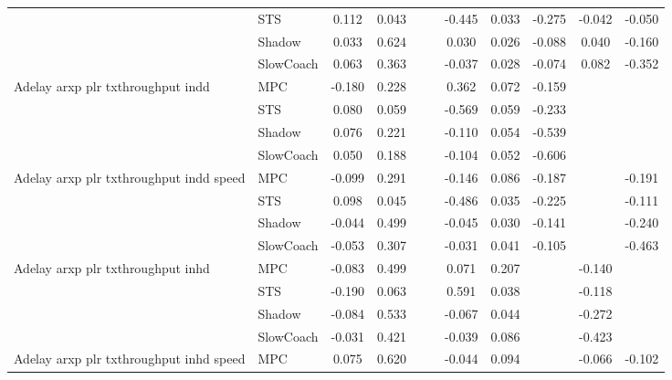 \begin{tabular}{|l|l|*{9}{c|}}
                              & STS &    0.112 &     0.043 &        &     & -0.445 &  0.033 &  -0.275 &  -0.042 &   -0.050 \\
                              & Shadow &    0.033 &     0.624 &        &     &  0.030 &  0.026 &  -0.088 &   0.040 &   -0.160 \\
                              & SlowCoach &    0.063 &     0.363 &        &     & -0.037 &  0.028 &  -0.074 &   0.082 &   -0.352 \\
\midrule
Adelay arxp plr txthroughput indd    & MPC &   -0.180 &     0.228 &        &     &  0.362 &  0.072 &  -0.159 &      &       \\
                              & STS &    0.080 &     0.059 &        &     & -0.569 &  0.059 &  -0.233 &      &       \\
                              & Shadow &    0.076 &     0.221 &        &     & -0.110 &  0.054 &  -0.539 &      &       \\
                              & SlowCoach &    0.050 &     0.188 &        &     & -0.104 &  0.052 &  -0.606 &      &       \\
\midrule
Adelay arxp plr txthroughput indd speed    & MPC &   -0.099 &     0.291 &        &     & -0.146 &  0.086 &  -0.187 &      &   -0.191 \\
                              & STS &    0.098 &     0.045 &        &     & -0.486 &  0.035 &  -0.225 &      &   -0.111 \\
                              & Shadow &   -0.044 &     0.499 &        &     & -0.045 &  0.030 &  -0.141 &      &   -0.240 \\
                              & SlowCoach &   -0.053 &     0.307 &        &     & -0.031 &  0.041 &  -0.105 &      &   -0.463 \\
\midrule
Adelay arxp plr txthroughput inhd    & MPC &   -0.083 &     0.499 &        &     &  0.071 &  0.207 &      &  -0.140 &       \\
                              & STS &   -0.190 &     0.063 &        &     &  0.591 &  0.038 &      &  -0.118 &       \\
                              & Shadow &   -0.084 &     0.533 &        &     & -0.067 &  0.044 &      &  -0.272 &       \\
                              & SlowCoach &   -0.031 &     0.421 &        &     & -0.039 &  0.086 &      &  -0.423 &       \\
\midrule
Adelay arxp plr txthroughput inhd speed    & MPC &    0.075 &     0.620 &        &     & -0.044 &  0.094 &      &  -0.066 &   -0.102 \\

\end{tabular}
